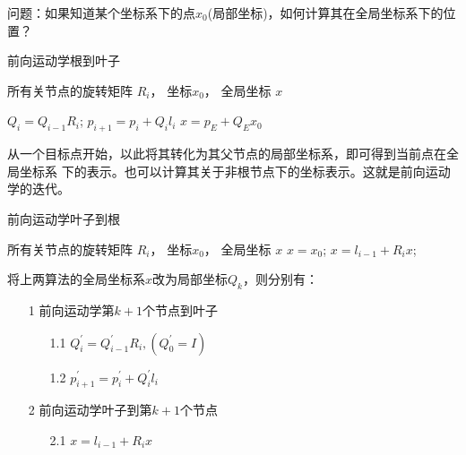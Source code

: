 \documentclass[lang=cn,newtx,10pt,scheme=chinese]{elegantbook}
\begin{document}
问题：如果知道某个坐标系下的点$x_0$(局部坐标)，如何计算其在全局坐标系下的位置？

 
 

\begin{algorithm}[h]
  \caption{前向运动学根到叶子}
  \label{alg::FKrootend}
  \begin{algorithmic}[1]
    \Require
      所有关节点的旋转矩阵 $R_i$， 坐标$x_0$，
    \Ensure
      全局坐标 $x$
 
        \State $Q_i = Q_{i-1}R_i$;
        \State $p_{i+1} = p_i + Q_{i}l_i$
    \EndFor
   \State $x = p_E + Q_E x_0$
  \end{algorithmic}
\end{algorithm}

从一个目标点开始，以此将其转化为其父节点的局部坐标系，即可得到当前点在全局坐标系
下的表示。也可以计算其关于非根节点下的坐标表示。这就是前向运动学的迭代。
\begin{algorithm}[h]
  \caption{前向运动学叶子到根}
  \label{alg::FKendroot}
  \begin{algorithmic}[1]
    \Require
      所有关节点的旋转矩阵 $R_i$， 坐标$x_0$，
    \Ensure
      全局坐标 $x$
    \State $x=x_0$;
        \State $x = l_{i-1} + R_i x$;
    \EndFor 
  \end{algorithmic}
\end{algorithm}

将上两算法的全局坐标系$x$改为局部坐标$Q_k$，则分别有：

\begin{itemize} 
  \item[1] 前向运动学第$k+1$个节点到叶子
  \begin{itemize}
    \item[1.1] $Q^{\prime}_i = Q^{\prime}_{i-1}R_i, (Q^{\prime}_{0}=I)$
    \item[1.2] $p^{\prime}_{i+1} = p^{\prime}_i + Q^{\prime}_{i}l_i$
  \end{itemize}
  \item[2] 前向运动学叶子到第$k+1$个节点
  \begin{itemize}
    \item[2.1] $x = l_{i-1} + R_i x$
  \end{itemize}
\end{itemize}
\end{document}
